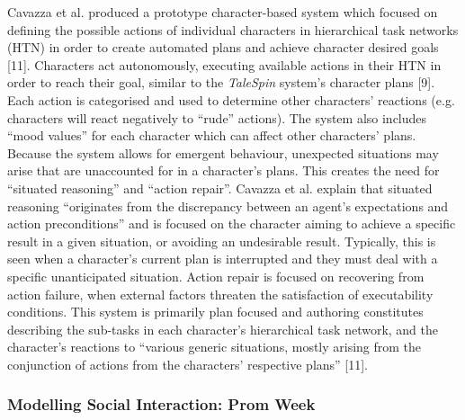 \documentclass{sig-alternate-05-2015}
\begin{document}
Cavazza et al. produced a prototype character-based system which focused on defining the possible actions of individual characters in hierarchical task networks (HTN) in order to create automated plans and achieve character desired goals [11]. Characters act autonomously, executing available actions in their HTN in order to reach their goal, similar to the \textit{TaleSpin} system's character plans [9].  Each action is categorised and used to determine other characters' reactions (e.g. characters will react negatively to ``rude'' actions). The system also includes ``mood values'' for each character which can affect other characters' plans. Because the system allows for emergent behaviour, unexpected situations may arise that are unaccounted for in a character's plans. This creates the need for ``situated reasoning'' and ``action repair''. Cavazza et al. explain that situated reasoning ``originates from the discrepancy between an agent's expectations and action preconditions'' and is focused on the character aiming to achieve a specific result in a given situation, or avoiding an undesirable result. Typically, this is seen when a character's current plan is interrupted and they must deal with a specific unanticipated situation. Action repair is focused on recovering from action failure, when external factors threaten the satisfaction of executability conditions. This system is primarily plan focused and authoring constitutes describing the sub-tasks in each character's hierarchical task network, and the character's reactions to ``various generic situations, mostly arising
from the conjunction of actions from the characters'
respective plans'' [11].\\ 

\subsubsection{Modelling Social Interaction: Prom Week}
\end{document}
